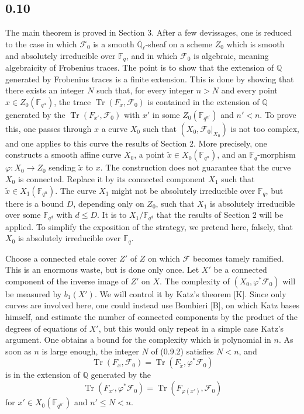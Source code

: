 \documentclass[10pt]{article}
\newcommand{\F}{\mathbb{F}}
\newcommand{\Q}{\mathbb{Q}}
\newcommand{\Ql}{\overline{\mathbb Q}_{\ell}}
\newcommand{\Tr}{\operatorname{Tr}}
\begin{document}
\subsection*{0.10}
The main theorem is proved in Section 3.
After a few devissages, one is reduced to the case in which $\mathcal F_0$ is a smooth $\Ql$-sheaf on a scheme $Z_0$ which is smooth and absolutely irreducible over $\F_q$, and in which $\mathcal F_0$ is algebraic, meaning algebraicity of Frobenius traces.
The point is to show that the extension of $\Q$ generated by Frobenius traces is a finite extension.
This is done by showing that there exists an integer $N$ such that, for every integer $n>N$ and every point $x\in Z_0(\F_{q^n})$, the trace $\Tr(F_x,\mathcal F_0)$ is contained in the extension of $\Q$ generated by the $\Tr(F_{x'},\mathcal F_0)$ with $x'$ in some $Z_0(\F_{q^{n'}})$ and $n'<n$.
To prove this, one passes through $x$ a curve $X_0$ such that $(X_0,\mathcal F_0|_{X_0})$ is not too complex, and one applies to this curve the results of Section 2.
More precisely, one constructs a smooth affine curve $X_0$, a point $\widetilde x\in X_0(\F_{q^n})$, and an $\F_q$-morphism $\varphi:X_0\to Z_0$ sending $\widetilde x$ to $x$.
The construction does not guarantee that the curve $X_0$ is connected.
Replace it by its connected component $X_1$ such that $\widetilde x\in X_1(\F_{q^n})$.
The curve $X_1$ might not be absolutely irreducible over $\F_q$, but there is a bound $D$, depending only on $Z_0$, such that $X_1$ is absolutely irreducible over some $\F_{q^d}$ with $d\le D$.
It is to $X_1/\F_{q^d}$ that the results of Section 2 will be applied.
To simplify the exposition of the strategy, we pretend here, falsely, that $X_0$ is absolutely irreducible over $\F_q$.

Choose a connected etale cover $Z'$ of $Z$ on which $\mathcal F$ becomes tamely ramified.
This is an enormous waste, but is done only once.
Let $X'$ be a connected component of the inverse image of $Z'$ on $X$.
The complexity of $(X_0,\varphi^*\mathcal F_0)$ will be measured by $b_1(X')$.
We will control it by Katz's theorem [K].
Since only curves are involved here, one could instead use Bombieri [B], on which Katz bases himself, and estimate the number of connected components by the product of the degrees of equations of $X'$, but this would only repeat in a simple case Katz's argument.
One obtains a bound for the complexity which is polynomial in $n$.
As soon as $n$ is large enough, the integer $N$ of (0.9.2) satisfies $N<n$, and
\[
 \Tr(F_x,\mathcal F_0)=\Tr(F_{\widetilde x},\varphi^*\mathcal F_0)
\]
is in the extension of $\Q$ generated by the
\[
 \Tr(F_{x'},\varphi^*\mathcal F_0)=\Tr(F_{\varphi(x')},\mathcal F_0)
\]
for $x'\in X_0(\F_{q^{n'}})$ and $n'\le N<n$.
\end{document}
